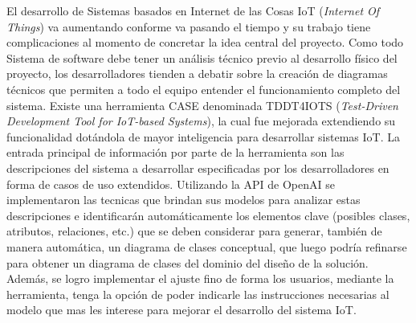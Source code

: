 
El desarrollo de Sistemas basados en Internet de las Cosas IoT (\textit{Internet Of Things}) va aumentando conforme va pasando el tiempo y su trabajo tiene complicaciones al momento de concretar la idea central del proyecto. Como todo Sistema de software debe tener un análisis técnico previo al desarrollo físico del proyecto, los desarrolladores tienden a debatir sobre la creación de diagramas técnicos que permiten a todo el equipo entender el funcionamiento completo del sistema. Existe una herramienta CASE denominada TDDT4IOTS (\textit{Test-Driven Development Tool for IoT-based Systems}), la cual fue mejorada extendiendo su funcionalidad dotándola de mayor inteligencia para desarrollar sistemas IoT. La entrada principal de información por parte de la herramienta son las descripciones del sistema a desarrollar especificadas por los desarrolladores en forma de casos de uso extendidos. Utilizando la API de OpenAI se implementaron las tecnicas que brindan sus modelos para analizar estas descripciones e identificarán automáticamente los elementos clave (posibles clases, atributos, relaciones, etc.) que se deben considerar para generar, también de manera automática, un diagrama de clases conceptual, que luego podría refinarse para obtener un diagrama de clases del dominio del diseño de la solución. Además, se logro implementar el ajuste fino de forma los usuarios, mediante la herramienta, tenga la opción de poder indicarle las instrucciones necesarias al modelo que mas les interese para mejorar el desarrollo del sistema IoT.